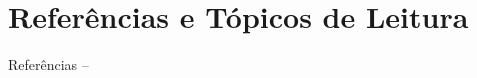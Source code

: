 
\section{Referências e Tópicos de Leitura}

    \begin{frame}[allowframebreaks]{Referências -- }
        
        
    \end{frame}




